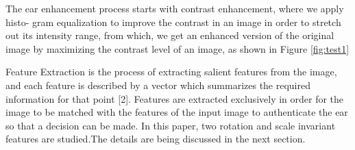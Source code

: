 The ear enhancement process starts with contrast enhancement, where we apply histo- gram equalization to improve the contrast in an image in order to stretch out its intensity range, from which, we get an enhanced version of the original image by maximizing the contrast level of an image, as shown in Figure \ref{fig:test1} 

Feature Extraction is the process of extracting salient features from the image, and each feature is described by a vector which summarizes the required information for that point [2]. Features are extracted exclusively in order for the image to be matched with the features of the input image to authenticate the ear so that a decision can be made. In this paper, two rotation and scale invariant features are studied.The details are being discussed in the next section.



